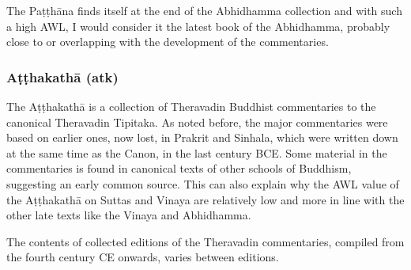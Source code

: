 The Paṭṭhāna finds itself at the end of the Abhidhamma collection and with such a high AWL, I would consider it the latest book of the Abhidhamma, probably close to or overlapping with the development of the commentaries.

\subsubsection{Aṭṭhakathā (atk)}
The Aṭṭhakathā is a collection of Theravadin Buddhist commentaries to the canonical Theravadin Tipitaka. As noted before, the major commentaries were based on earlier ones, now lost, in Prakrit and Sinhala, which were written down at the same time as the Canon, in the last century BCE. Some material in the commentaries is found in canonical texts of other schools of Buddhism, suggesting an early common source. This can also explain why the AWL value of the Aṭṭhakathā on Suttas and Vinaya are relatively low and more in line with the other late texts like the Vinaya and Abhidhamma.

The contents of collected editions of the Theravadin commentaries, compiled from the fourth century CE onwards, varies between editions. 

